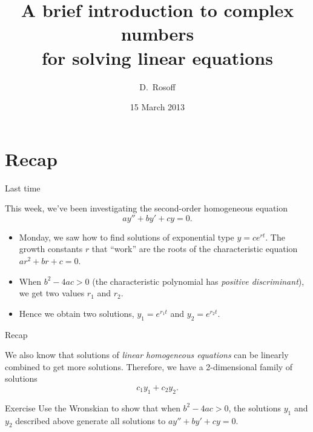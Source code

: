 \documentclass{beamer}
\title[Complex Numbers]{A brief introduction to complex numbers \\
for solving linear equations}
\author{D.\ Rosoff}
\institute{College of Idaho}
\date{15 March 2013}
\begin{document}
\begin{frame}
  \titlepage
\end{frame}


\section{Recap}

\begin{frame}{Last time}

This week, we've been investigating the second-order homogeneous equation
\[
   ay'' + by' + cy = 0.
\]

\begin{itemize}
  \item Monday, we saw how to find solutions of exponential type $y = ce^{rt}$. The growth constants $r$ that ``work'' are the roots of the characteristic equation $ar^2 + br + c = 0$.
  \pause
  \item When $b^2 - 4ac > 0$ (the characteristic polynomial has \emph{positive discriminant}), we get two values $r_1$ and $r_2$. 
  \pause
  \item Hence we obtain two solutions, $y_1 = e^{r_1 t}$ and $y_2 = e^{r_2 t}$.
\end{itemize}

\end{frame}

\begin{frame}{Recap}

We also know that solutions of \emph{linear homogeneous equations} can be linearly combined to get more solutions. Therefore, we have a 2-dimensional family of solutions
\[
  c_1 y_1 + c_2 y_2.
\]

\begin{block}{Exercise}
Use the Wronskian to show that when $b^2 - 4ac > 0$, the solutions $y_1$ and $y_2$ described above generate all solutions to $ay'' + by' + cy = 0$.
\end{block}

\end{frame}
\end{document}

